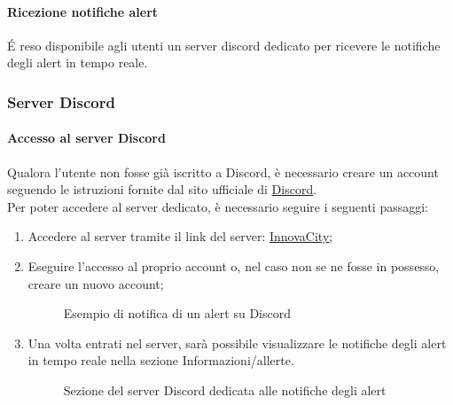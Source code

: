 \paragraph{Ricezione notifiche alert}
É reso disponibile agli utenti un server discord dedicato per ricevere le notifiche degli alert in tempo reale.\\


\subsubsection{Server Discord}

\paragraph{Accesso al server Discord}
Qualora l'utente non fosse già iscritto a Discord, è necessario creare un account seguendo le istruzioni fornite dal sito ufficiale di \href{https://discord.com/}{Discord}.\\
Per poter accedere al server dedicato, è necessario seguire i seguenti passaggi:
\begin{enumerate}
    \item Accedere al server tramite il link del server: \href{https://discord.gg/9VZ8me7x}{InnovaCity};
    \item Eseguire l'accesso al proprio account o, nel caso non se ne fosse in possesso, creare un nuovo account;
    \begin{figure}[H]
        \centering
        \caption{Esempio di notifica di un alert su Discord}
        \label{fig:my_label}
    \end{figure}
    \item Una volta entrati nel server, sarà possibile visualizzare le notifiche degli alert in tempo reale nella sezione Informazioni/allerte.
    \begin{figure}[H]
        \centering
        \caption{Sezione del server Discord dedicata alle notifiche degli alert}    
        \label{fig:my_label}
    \end{figure}
\end{enumerate}


